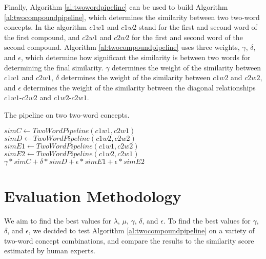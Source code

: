 \documentclass{article}
\begin{document}
Finally, Algorithm \ref{al:twowordpipeline} can be used to build Algorithm \ref{al:twocompoundpipeline}, which determines the similarity between two two-word concepts. In the algorithm $c1w1$ and $c1w2$ stand for the first and second word of the first compound, and $c2w1$ and $c2w2$ for the first and second word of the second compound. Algorithm \ref{al:twocompoundpipeline} uses three weights, $\gamma$, $\delta$, and $\epsilon$, which determine how significant the similarity is between two words for determining the final similarity. $\gamma$ determines the weight of the similarity between $c1w1$ and $c2w1$, $\delta$ determines the weight of the similarity between $c1w2$ and $c2w2$, and $\epsilon$ determines the weight of the similarity between the diagonal relationships $c1w1$-$c2w2$ and $c1w2$-$c2w1$.

\begin{algorithm}
\caption{The pipeline on two two-word concepts.}\label{al:twocompoundpipeline}
\begin{algorithmic}[1]
		\State $\textit{simC} \gets \textit{TwoWordPipeline}(c1w1, c2w1)$
		\State $\textit{simD} \gets \textit{TwoWordPipeline}(c1w2, c2w2)$
		\State $\textit{simE1} \gets \textit{TwoWordPipeline}(c1w1, c2w2)$
		\State $\textit{simE2} \gets \textit{TwoWordPipeline}(c1w2, c2w1)$
		\State \Return $\gamma * \textit{simC} + \delta * \textit{simD} + \epsilon * \textit{simE1} + \epsilon * \textit{simE2}$
	\EndProcedure
\end{algorithmic}
\end{algorithm}

\section{Evaluation Methodology} \label{sec:evalmeth}

We aim to find the best values for $\lambda$, $\mu$, $\gamma$, $\delta$, and $\epsilon$. To find the best values for $\gamma$, $\delta$, and $\epsilon$, we decided to test Algorithm \ref{al:twocompoundpipeline} on a variety of two-word concept combinations, and compare the results to the similarity score estimated by human experts.
\end{document}
